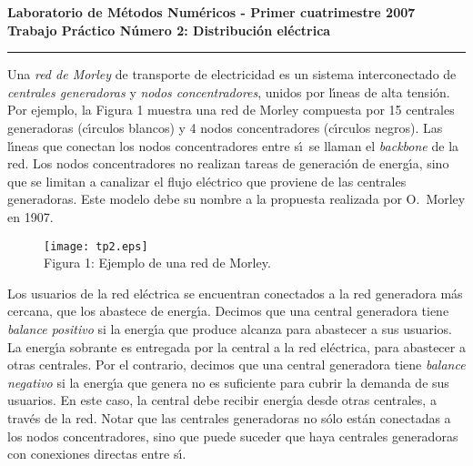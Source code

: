 \documentclass[11pt, a4paper]{article}
\begin{document}
\begin{centering}
\bf Laboratorio de M\'etodos Num\'ericos - Primer cuatrimestre 2007 \\
\bf Trabajo Pr\'actico N\'umero 2: Distribuci\'on el\'ectrica \\
\end{centering}

\vskip 25pt
\hrule
\vskip 11pt

Una \emph{red de Morley} de transporte de electricidad es un sistema
interconectado de \emph{centrales generadoras} y \emph{nodos concentradores},
unidos por l\'\i neas de alta tensi\'on. Por ejemplo, la Figura 1
muestra una red de Morley compuesta por 15 centrales generadoras
(c\'\i rculos blancos) y 4 nodos concentradores (c\'\i rculos negros). Las
l\'\i neas que conectan los nodos concentradores entre s\'\i\ se llaman
el \emph{backbone} de la red. Los nodos concentradores no realizan tareas
de generaci\'on de energ\'\i a, sino que se limitan a canalizar el flujo
el\'ectrico que proviene de las centrales generadoras. Este modelo debe
su nombre a la propuesta realizada por O.~Morley en 1907.

\begin{figure}[h]
\centering
\texttt{[image: tp2.eps]} \\
Figura 1: Ejemplo de una red de Morley.
\end{figure}

Los usuarios de la red el\'ectrica se encuentran conectados a la red
generadora m\'as cercana, que los abastece de energ\'\i a. Decimos que una
central generadora tiene \emph{balance positivo} si la energ\'\i a que
produce alcanza para abastecer a sus usuarios. La energ\'\i a sobrante es
entregada por la central a la red el\'ectrica, para abastecer a otras
centrales. Por el contrario, decimos que una central generadora tiene
\emph{balance negativo} si la energ\'\i a que genera no es suficiente para
cubrir la demanda de sus usuarios. En este caso, la central debe recibir
energ\'\i a desde otras centrales, a trav\'es de la red. Notar que las
centrales generadoras no s\'olo est\'an conectadas a los nodos
concentradores, sino que puede suceder que haya centrales generadoras
con conexiones directas entre s\'\i.
\end{document}
